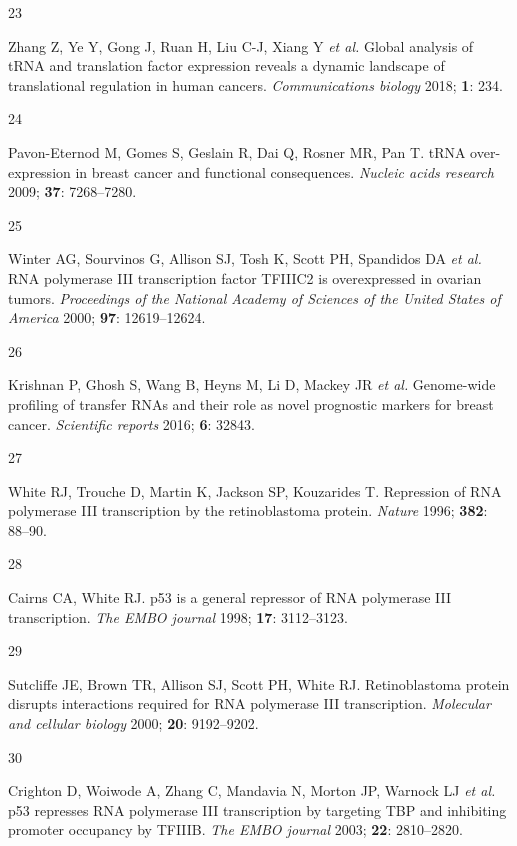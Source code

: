 \documentclass[
  12pt,
]{article}
\newlength{\cslhangindent}
\newlength{\csllabelwidth}
\newlength{\cslentryspacingunit} %
\newenvironment{CSLReferences}[2] %
 {%
  \setlength{\parindent}{0pt}
  \ifodd #1
  \let\oldpar\par
  \def\par{\hangindent=\cslhangindent\oldpar}
  \fi
  \setlength{\parskip}{#2\cslentryspacingunit}
 }%
 {}
\newcommand{\CSLLeftMargin}[1]{\parbox[t]{\csllabelwidth}{#1}}
\newcommand{\CSLRightInline}[1]{\parbox[t]{\linewidth - \csllabelwidth}{#1}\break}
\begin{document}
\begin{CSLReferences}{0}{0}
\leavevmode{}%
\CSLLeftMargin{23 }%
\CSLRightInline{Zhang Z, Ye Y, Gong J, Ruan H, Liu C-J, Xiang Y \emph{et al.} Global analysis of {tRNA} and translation factor expression reveals a dynamic landscape of translational regulation in human cancers. \emph{Communications biology} 2018; \textbf{1}: 234.}

\leavevmode{}%
\CSLLeftMargin{24 }%
\CSLRightInline{Pavon-Eternod M, Gomes S, Geslain R, Dai Q, Rosner MR, Pan T. {tRNA} over-expression in breast cancer and functional consequences. \emph{Nucleic acids research} 2009; \textbf{37}: 7268--7280.}

\leavevmode{}%
\CSLLeftMargin{25 }%
\CSLRightInline{Winter AG, Sourvinos G, Allison SJ, Tosh K, Scott PH, Spandidos DA \emph{et al.} {RNA} polymerase {III} transcription factor {TFIIIC2} is overexpressed in ovarian tumors. \emph{Proceedings of the National Academy of Sciences of the United States of America} 2000; \textbf{97}: 12619--12624.}

\leavevmode{}%
\CSLLeftMargin{26 }%
\CSLRightInline{Krishnan P, Ghosh S, Wang B, Heyns M, Li D, Mackey JR \emph{et al.} Genome-wide profiling of transfer {RNAs} and their role as novel prognostic markers for breast cancer. \emph{Scientific reports} 2016; \textbf{6}: 32843.}

\leavevmode{}%
\CSLLeftMargin{27 }%
\CSLRightInline{White RJ, Trouche D, Martin K, Jackson SP, Kouzarides T. Repression of {RNA} polymerase {III} transcription by the retinoblastoma protein. \emph{Nature} 1996; \textbf{382}: 88--90.}

\leavevmode{}%
\CSLLeftMargin{28 }%
\CSLRightInline{Cairns CA, White RJ. p53 is a general repressor of {RNA} polymerase {III} transcription. \emph{The EMBO journal} 1998; \textbf{17}: 3112--3123.}

\leavevmode{}%
\CSLLeftMargin{29 }%
\CSLRightInline{Sutcliffe JE, Brown TR, Allison SJ, Scott PH, White RJ. Retinoblastoma protein disrupts interactions required for {RNA} polymerase {III} transcription. \emph{Molecular and cellular biology} 2000; \textbf{20}: 9192--9202.}

\leavevmode{}%
\CSLLeftMargin{30 }%
\CSLRightInline{Crighton D, Woiwode A, Zhang C, Mandavia N, Morton JP, Warnock LJ \emph{et al.} p53 represses {RNA} polymerase {III} transcription by targeting {TBP} and inhibiting promoter occupancy by {TFIIIB}. \emph{The EMBO journal} 2003; \textbf{22}: 2810--2820.}


\end{CSLReferences}
\end{document}
